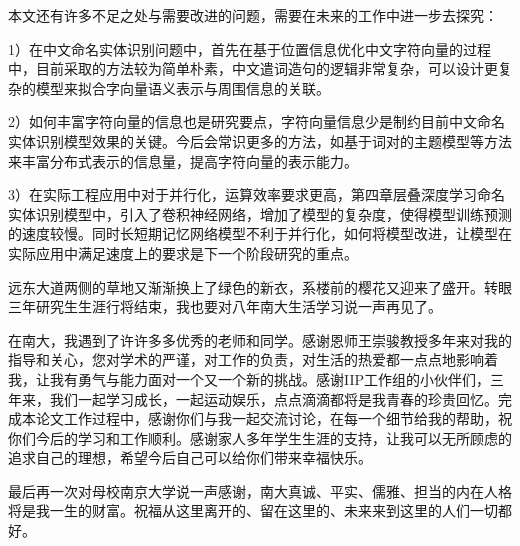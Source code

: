 \documentclass[winfonts,master,oneside,nobackinfo]{njuthesis}
\begin{document}
本文还有许多不足之处与需要改进的问题，需要在未来的工作中进一步去探究：

1）在中文命名实体识别问题中，首先在基于位置信息优化中文字符向量的过程中，目前采取的方法较为简单朴素，中文遣词造句的逻辑非常复杂，可以设计更复杂的模型来拟合字向量语义表示与周围信息的关联。

2）如何丰富字符向量的信息也是研究要点，字符向量信息少是制约目前中文命名实体识别模型效果的关键。今后会常识更多的方法，如基于词对的主题模型等方法来丰富分布式表示的信息量，提高字符向量的表示能力。

3）在实际工程应用中对于并行化，运算效率要求更高，第四章层叠深度学习命名实体识别模型中，引入了卷积神经网络，增加了模型的复杂度，使得模型训练预测的速度较慢。同时长短期记忆网络模型不利于并行化，如何将模型改进，让模型在实际应用中满足速度上的要求是下一个阶段研究的重点。




\begin{acknowledgement}

远东大道两侧的草地又渐渐换上了绿色的新衣，系楼前的樱花又迎来了盛开。转眼三年研究生生涯行将结束，我也要对八年南大生活学习说一声再见了。

在南大，我遇到了许许多多优秀的老师和同学。感谢恩师王崇骏教授多年来对我的指导和关心，您对学术的严谨，对工作的负责，对生活的热爱都一点点地影响着我，让我有勇气与能力面对一个又一个新的挑战。感谢IIP工作组的小伙伴们，三年来，我们一起学习成长，一起运动娱乐，点点滴滴都将是我青春的珍贵回忆。完成本论文工作过程中，感谢你们与我一起交流讨论，在每一个细节给我的帮助，祝你们今后的学习和工作顺利。感谢家人多年学生生涯的支持，让我可以无所顾虑的追求自己的理想，希望今后自己可以给你们带来幸福快乐。

最后再一次对母校南京大学说一声感谢，南大真诚、平实、儒雅、担当的内在人格将是我一生的财富。祝福从这里离开的、留在这里的、未来来到这里的人们一切都好。

\end{acknowledgement}






\end{document}
